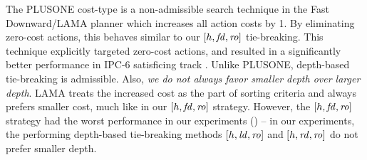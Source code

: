 The PLUSONE %
cost-type is a non-admissible search technique in the Fast Downward/LAMA planner
\cite{richter2010lama} which increases all action costs by 1.
By eliminating zero-cost actions, this behaves similar to our
$[h,\mbox{\textit{fd}},\mbox{\textit{ro}}]$ tie-breaking.
This technique explicitly targeted zero-cost actions,
and resulted in a significantly better performance in IPC-6
satisficing track \cite{richter2010lama}.
Unlike PLUSONE, depth-based tie-breaking is admissible.
Also, \emph{we
do not always favor smaller depth over larger depth}. LAMA treats the
increased cost as the part of sorting criteria and always prefers
smaller cost, much like in our $[h,\mbox{\textit{fd}},\mbox{\textit{ro}}]$ strategy.  However, the $[h,\mbox{\textit{fd}},\mbox{\textit{ro}}]$
strategy had the worst performance in our experiments () -- in our experiments, 
the performing depth-based tie-breaking methods $[h,\mbox{\textit{ld}},\mbox{\textit{ro}}]$ and $[h,\mbox{\textit{rd}},\mbox{\textit{ro}}]$
do not prefer smaller depth.

